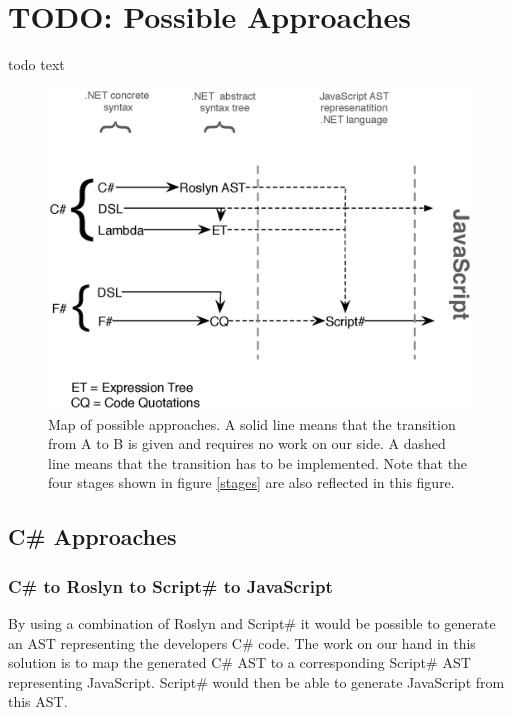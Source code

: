 \section{TODO: Possible Approaches} %
\label{sec:possible_approaches}
	todo text

	\begin{figure}[H]
		\begin{center}
			\centerline{\includegraphics[width=14cm]{resources/images/approachComparison.eps}}
		\end{center}
		\caption{Map of possible approaches. A solid line means that the transition from A to B is given and requires no work on our side. A dashed line means that the transition has to be implemented. Note that the four stages shown in figure \ref{stages} are also reflected in this figure.}
		\label{approachMap}
	\end{figure}


	\subsection{C\# Approaches} %
	\label{sub:csharp_approaches}
		
		\subsubsection{C\# to Roslyn to Script\# to JavaScript} %
		\label{ssub:c_to_roslyn_to_script_to_javascript}
			By using a combination of Roslyn and Script\# it would be possible to generate an AST representing the developers C\# code. The work on our hand in this solution is to map the generated C\# AST to a corresponding Script\# AST representing JavaScript. Script\# would then be able to generate JavaScript from this AST.

